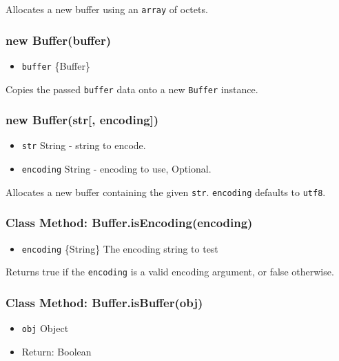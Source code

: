 Allocates a new buffer using an \texttt{array} of octets.

\subsubsection{new Buffer(buffer)}\label{new-bufferbuffer}

\begin{itemize}
\itemsep1pt\parskip0pt
\item
  \texttt{buffer} \{Buffer\}
\end{itemize}

Copies the passed \texttt{buffer} data onto a new \texttt{Buffer}
instance.

\subsubsection{new Buffer(str{[},
encoding{]})}\label{new-bufferstr-encoding}

\begin{itemize}
\itemsep1pt\parskip0pt
\item
  \texttt{str} String - string to encode.
\item
  \texttt{encoding} String - encoding to use, Optional.
\end{itemize}

Allocates a new buffer containing the given \texttt{str}.
\texttt{encoding} defaults to
\texttt{\textquotesingle{}utf8\textquotesingle{}}.

\subsubsection{Class Method:
Buffer.isEncoding(encoding)}\label{class-method-buffer.isencodingencoding}

\begin{itemize}
\itemsep1pt\parskip0pt
\item
  \texttt{encoding} \{String\} The encoding string to test
\end{itemize}

Returns true if the \texttt{encoding} is a valid encoding argument, or
false otherwise.

\subsubsection{Class Method:
Buffer.isBuffer(obj)}\label{class-method-buffer.isbufferobj}

\begin{itemize}
\itemsep1pt\parskip0pt
\item
  \texttt{obj} Object
\item
  Return: Boolean
\end{itemize}

